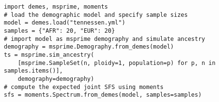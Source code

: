\documentclass{article}
\begin{document}
\begin{verbatim}
import demes, msprime, moments
# load the demographic model and specify sample sizes
model = demes.load("tennessen.yml")
samples = {"AFR": 20, "EUR": 20}
# import model as msprime demography and simulate ancestry
demography = msprime.Demography.from_demes(model)
ts = msprime.sim_ancestry(
    [msprime.SampleSet(n, ploidy=1, population=p) for p, n in samples.items()],
    demography=demography)
# compute the expected joint SFS using moments
sfs = moments.Spectrum.from_demes(model, samples=samples)
\end{verbatim}
\end{document}
